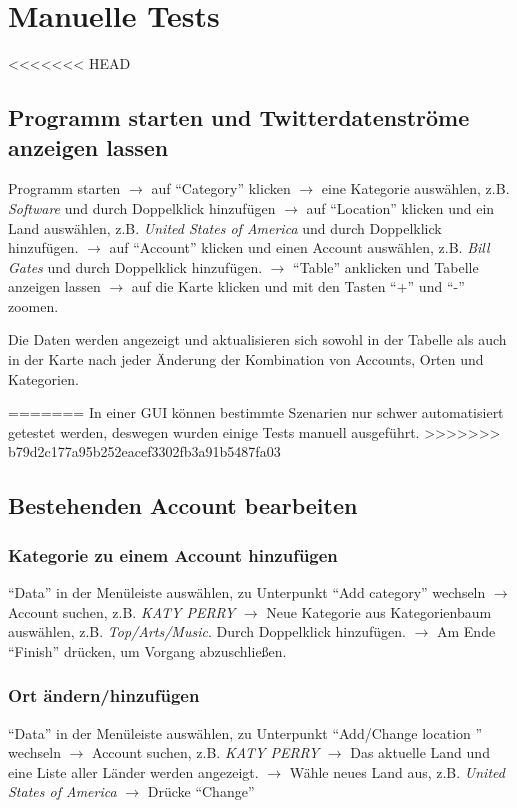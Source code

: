 \section{Manuelle Tests}
<<<<<<< HEAD

\subsection{Programm starten und Twitterdatenströme anzeigen lassen}

Programm starten $\to$ auf "`Category"' klicken $\to$ eine Kategorie auswählen, z.B. \textit{Software} und durch Doppelklick hinzufügen $\to$ auf "`Location"' klicken und ein Land auswählen, z.B. \textit{United States of America} und durch Doppelklick hinzufügen. $\to$ auf "`Account"' klicken und einen Account auswählen, z.B. \textit{Bill Gates} und durch Doppelklick hinzufügen. $\to$ "`Table"' anklicken und Tabelle anzeigen lassen $\to$ auf die Karte klicken und mit den Tasten "`+"' und "`-"' zoomen.

Die Daten werden angezeigt und aktualisieren sich sowohl in der Tabelle als auch in der Karte nach jeder Änderung der Kombination von Accounts, Orten und Kategorien.

=======
In einer GUI können bestimmte Szenarien nur schwer automatisiert getestet werden, deswegen wurden einige Tests manuell ausgeführt.
>>>>>>> b79d2c177a95b252eacef3302fb3a91b5487fa03
\subsection{Bestehenden Account bearbeiten}

\subsubsection{Kategorie zu einem Account hinzufügen}
"`Data"' in der Menüleiste auswählen, zu Unterpunkt "`Add category"' wechseln $\to$ Account suchen,  z.B. \textit{KATY PERRY} $\to$ Neue Kategorie aus Kategorienbaum auswählen, z.B. \textit{Top/Arts/Music}. Durch Doppelklick hinzufügen. $\to$ Am Ende "`Finish"' drücken, um Vorgang abzuschließen.

\subsubsection{Ort ändern/hinzufügen}
"`Data"' in der Menüleiste auswählen, zu Unterpunkt "`Add/Change location "' wechseln $\to$ Account suchen,  z.B. \textit{KATY PERRY} $\to$ Das aktuelle Land und eine Liste aller Länder werden angezeigt. $\to$ Wähle neues Land aus, z.B. \textit{United States of America} $\to$ Drücke "`Change"'

